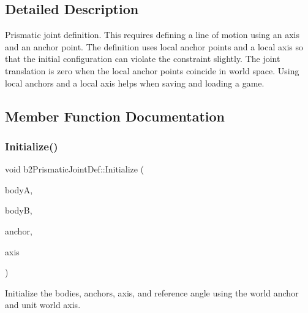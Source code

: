 \subsection{Detailed Description}
Prismatic joint definition. This requires defining a line of motion using an axis and an anchor point. The definition uses local anchor points and a local axis so that the initial configuration can violate the constraint slightly. The joint translation is zero when the local anchor points coincide in world space. Using local anchors and a local axis helps when saving and loading a game. 

\subsection{Member Function Documentation}
\mbox{\label{structb2PrismaticJointDef_ae60043bc22b077e8c59ab248dc34652f}} 
\subsubsection{\texorpdfstring{Initialize()}{Initialize()}\hspace{0.1cm}{\footnotesize\ttfamily [1/2]}}
{\footnotesize\ttfamily void b2\+Prismatic\+Joint\+Def\+::\+Initialize (\begin{DoxyParamCaption}\item[{\hyperlink{classb2Body}{b2\+Body} $\ast$}]{bodyA,  }\item[{\hyperlink{classb2Body}{b2\+Body} $\ast$}]{bodyB,  }\item[{const \hyperlink{structb2Vec2}{b2\+Vec2} \&}]{anchor,  }\item[{const \hyperlink{structb2Vec2}{b2\+Vec2} \&}]{axis }\end{DoxyParamCaption})}

Initialize the bodies, anchors, axis, and reference angle using the world anchor and unit world axis. \mbox{\label{structb2PrismaticJointDef_ae60043bc22b077e8c59ab248dc34652f}} 
